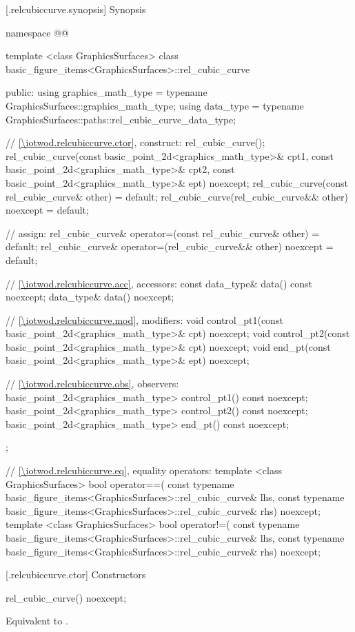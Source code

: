  [\iotwod.relcubiccurve.synopsis] {Synopsis}
\begin{codeblock}
namespace @\fullnamespace{}@ {
  template <class GraphicsSurfaces>
  class basic_figure_items<GraphicsSurfaces>::rel_cubic_curve {
  public:
    using graphics_math_type = typename GraphicsSurfaces::graphics_math_type;
    using data_type =
      typename GraphicsSurfaces::paths::rel_cubic_curve_data_type;

    // \ref{\iotwod.relcubiccurve.ctor}, construct:
    rel_cubic_curve();
    rel_cubic_curve(const basic_point_2d<graphics_math_type>& cpt1,
       const basic_point_2d<graphics_math_type>& cpt2,
       const basic_point_2d<graphics_math_type>& ept) noexcept;
    rel_cubic_curve(const rel_cubic_curve& other) = default;
    rel_cubic_curve(rel_cubic_curve&& other) noexcept = default;

    // assign:
    rel_cubic_curve& operator=(const rel_cubic_curve& other) = default;
    rel_cubic_curve& operator=(rel_cubic_curve&& other) noexcept = default;

    // \ref{\iotwod.relcubiccurve.acc}, accessors:
    const data_type& data() const noexcept;
    data_type& data() noexcept;

    // \ref{\iotwod.relcubiccurve.mod}, modifiers:
    void control_pt1(const basic_point_2d<graphics_math_type>& cpt) noexcept;
    void control_pt2(const basic_point_2d<graphics_math_type>& cpt) noexcept;
    void end_pt(const basic_point_2d<graphics_math_type>& ept) noexcept;

    // \ref{\iotwod.relcubiccurve.obs}, observers:
    basic_point_2d<graphics_math_type> control_pt1() const noexcept;
    basic_point_2d<graphics_math_type> control_pt2() const noexcept;
    basic_point_2d<graphics_math_type> end_pt() const noexcept;
  };

  // \ref{\iotwod.relcubiccurve.eq}, equality operators:
  template <class GraphicsSurfaces>
  bool operator==(
    const typename basic_figure_items<GraphicsSurfaces>::rel_cubic_curve& lhs,
    const typename basic_figure_items<GraphicsSurfaces>::rel_cubic_curve& rhs) 
    noexcept;  
  template <class GraphicsSurfaces>
  bool operator!=(
    const typename basic_figure_items<GraphicsSurfaces>::rel_cubic_curve& lhs,
    const typename basic_figure_items<GraphicsSurfaces>::rel_cubic_curve& rhs) 
    noexcept;  
}
\end{codeblock}

 [\iotwod.relcubiccurve.ctor] {Constructors}%

%
\begin{itemdecl}
rel_cubic_curve() noexcept;
\end{itemdecl}
\begin{itemdescr}
\pnum
\effects
Equivalent to .
\end{itemdescr}

